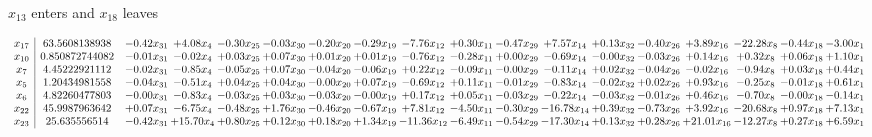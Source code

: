 \documentclass[9pt]{article}
\begin{document}
 $ x_{13} $ enters and $ x_{18} $ leaves 

 \[\begin{array}{c| c c@{\hskip 2pt} c@{\hskip 2pt} c@{\hskip 2pt} c@{\hskip 2pt} c@{\hskip 2pt} c@{\hskip 2pt} c@{\hskip 2pt} c@{\hskip 2pt} c@{\hskip 2pt} c@{\hskip 2pt} c@{\hskip 2pt} c@{\hskip 2pt} c@{\hskip 2pt} c@{\hskip 2pt} c@{\hskip 2pt} c@{\hskip 2pt} }
 x_{17}   &  63.5608138938 & -0.42 x_{31} & +  4.08 x_{4} & -0.30 x_{25} & -0.03 x_{30} & -0.20 x_{20} & -0.29 x_{19} & -7.76 x_{12} & +  0.30 x_{11} & -0.47 x_{29} & +  7.57 x_{14} & +  0.13 x_{32} & -0.40 x_{26} & +  3.89 x_{16} & -22.28 x_{8} & -0.44 x_{18} & -3.00 x_{1}\\
 x_{10}   &  0.850872744082 & -0.01 x_{31} & -0.02 x_{4} & +  0.03 x_{25} & +  0.07 x_{30} & +  0.01 x_{20} & +  0.01 x_{19} & -0.76 x_{12} & -0.28 x_{11} & +  0.00 x_{29} & -0.69 x_{14} & -0.00 x_{32} & -0.03 x_{26} & +  0.14 x_{16} & +  0.32 x_{8} & +  0.06 x_{18} & +  1.10 x_{1}\\
 x_{7}   &  4.45222921112 & -0.02 x_{31} & -0.85 x_{4} & -0.05 x_{25} & +  0.07 x_{30} & -0.04 x_{20} & -0.06 x_{19} & +  0.22 x_{12} & -0.09 x_{11} & -0.00 x_{29} & -0.11 x_{14} & +  0.02 x_{32} & -0.04 x_{26} & -0.02 x_{16} & -0.94 x_{8} & +  0.03 x_{18} & +  0.44 x_{1}\\
 x_{5}   &  1.20434981558 & -0.04 x_{31} & -0.51 x_{4} & +  0.04 x_{25} & +  0.04 x_{30} & -0.00 x_{20} & +  0.07 x_{19} & -0.69 x_{12} & +  0.11 x_{11} & -0.01 x_{29} & -0.83 x_{14} & -0.02 x_{32} & +  0.02 x_{26} & +  0.93 x_{16} & -0.25 x_{8} & -0.01 x_{18} & +  0.61 x_{1}\\
 x_{6}   &  4.82260477803 & -0.00 x_{31} & -0.83 x_{4} & -0.03 x_{25} & +  0.03 x_{30} & -0.03 x_{20} & -0.00 x_{19} & +  0.17 x_{12} & +  0.05 x_{11} & -0.03 x_{29} & -0.22 x_{14} & -0.03 x_{32} & -0.01 x_{26} & +  0.46 x_{16} & -0.70 x_{8} & -0.00 x_{18} & -0.14 x_{1}\\
 x_{22}   &  45.9987963642 & +  0.07 x_{31} & -6.75 x_{4} & -0.48 x_{25} & +  1.76 x_{30} & -0.46 x_{20} & -0.67 x_{19} & +  7.81 x_{12} & -4.50 x_{11} & -0.30 x_{29} & -16.78 x_{14} & +  0.39 x_{32} & -0.73 x_{26} & +  3.92 x_{16} & -20.68 x_{8} & +  0.97 x_{18} & +  7.13 x_{1}\\
 x_{23}   &  25.635556514 & -0.42 x_{31} & + 15.70 x_{4} & +  0.80 x_{25} & +  0.12 x_{30} & +  0.18 x_{20} & +  1.34 x_{19} & -11.36 x_{12} & -6.49 x_{11} & -0.54 x_{29} & -17.30 x_{14} & +  0.13 x_{32} & +  0.28 x_{26} & + 21.01 x_{16} & -12.27 x_{8} & +  0.27 x_{18} & +  6.59 x_{1}\\

\end{array}\]
\end{document}

